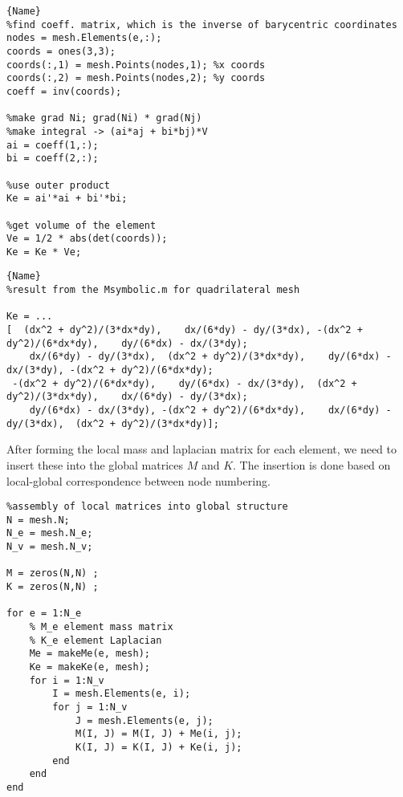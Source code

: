 \documentclass[unicode,11pt,a4paper,oneside,numbers=endperiod,openany]{scrartcl}
\begin{document}
\noindent\begin{minipage}{.38\textwidth}
\begin{lstlisting}[caption=Triangular $k_e$,frame=tlrb]{Name}
%find coeff. matrix, which is the inverse of barycentric coordinates
nodes = mesh.Elements(e,:); 
coords = ones(3,3);
coords(:,1) = mesh.Points(nodes,1); %x coords
coords(:,2) = mesh.Points(nodes,2); %y coords
coeff = inv(coords);

%make grad Ni; grad(Ni) * grad(Nj)
%make integral -> (ai*aj + bi*bj)*V
ai = coeff(1,:);
bi = coeff(2,:);

%use outer product
Ke = ai'*ai + bi'*bi;

%get volume of the element
Ve = 1/2 * abs(det(coords));
Ke = Ke * Ve;
\end{lstlisting}
\end{minipage}\hfill
\begin{minipage}{.51\textwidth}
\begin{lstlisting}[caption=Quadrilateral $k_e$,frame=tlrb]{Name}
%result from the Msymbolic.m for quadrilateral mesh

Ke = ... 
[  (dx^2 + dy^2)/(3*dx*dy),    dx/(6*dy) - dy/(3*dx), -(dx^2 + dy^2)/(6*dx*dy),    dy/(6*dx) - dx/(3*dy);
    dx/(6*dy) - dy/(3*dx),  (dx^2 + dy^2)/(3*dx*dy),    dy/(6*dx) - dx/(3*dy), -(dx^2 + dy^2)/(6*dx*dy);
 -(dx^2 + dy^2)/(6*dx*dy),    dy/(6*dx) - dx/(3*dy),  (dx^2 + dy^2)/(3*dx*dy),    dx/(6*dy) - dy/(3*dx);
    dy/(6*dx) - dx/(3*dy), -(dx^2 + dy^2)/(6*dx*dy),    dx/(6*dy) - dy/(3*dx),  (dx^2 + dy^2)/(3*dx*dy)];
\end{lstlisting}
\end{minipage}

After forming the local mass and laplacian matrix for each element, we need to insert these into the global matrices $M$ and $K$. The insertion is done based on local-global correspondence between node numbering. 
\begin{lstlisting}
%assembly of local matrices into global structure
N = mesh.N;
N_e = mesh.N_e;
N_v = mesh.N_v;

M = zeros(N,N) ;
K = zeros(N,N) ;

for e = 1:N_e
    % M_e element mass matrix
    % K_e element Laplacian
    Me = makeMe(e, mesh);
    Ke = makeKe(e, mesh);
    for i = 1:N_v
        I = mesh.Elements(e, i);
        for j = 1:N_v
            J = mesh.Elements(e, j);
            M(I, J) = M(I, J) + Me(i, j);
            K(I, J) = K(I, J) + Ke(i, j);
        end
    end
end
\end{lstlisting}
\end{document}
